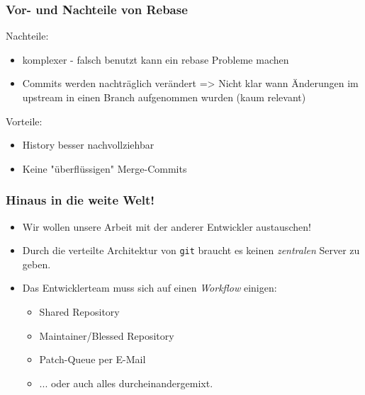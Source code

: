 \documentclass{beamer}
\begin{document}
\begin{frame}
\frametitle{Vor- und Nachteile von Rebase}
Nachteile:
	\begin{itemize}
		\item{komplexer - falsch benutzt kann ein rebase Probleme machen}
		\item{Commits werden nachträglich verändert => Nicht klar wann Änderungen im upstream in einen Branch aufgenommen wurden (kaum relevant)}
	\end{itemize}
Vorteile:
	\begin{itemize}
		\item{History besser nachvollziehbar}
		\item{Keine "{}überflüssigen"{} Merge-Commits}
	\end{itemize}
\end{frame}

\begin{frame}
\frametitle{Hinaus in die weite Welt!}
\begin{itemize}
	\item Wir wollen unsere Arbeit mit der anderer Entwickler austauschen!
	\item Durch die verteilte Architektur von \texttt{git} braucht es keinen \emph{zentralen} Server zu geben.
	\item Das Entwicklerteam muss sich auf einen \emph{Workflow} einigen:
	\begin{itemize}
		\item Shared Repository
		\item Maintainer/Blessed Repository
		\item Patch-Queue per E-Mail
		\item ... oder auch alles durcheinandergemixt.
	\end{itemize}
\end{itemize}
\end{frame}
\end{document}

